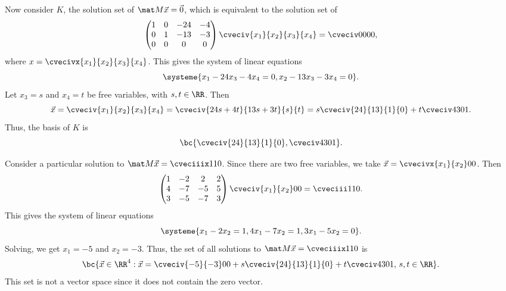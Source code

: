 \begin{solution}
\begin{ppart}
        Now consider $K$, the solution set of $\mat M \vec x = \vec 0$, which is equivalent to the solution set of \[\begin{pmatrix}1 & 0 & -24 & -4 \\ 0 & 1 & -13 & -3 \\ 0 & 0 & 0 & 0\end{pmatrix} \cveciv{x_1}{x_2}{x_3}{x_4} = \cveciv0000,\] where $x = \cvecivx{x_1}{x_2}{x_3}{x_4}$. This gives the system of linear equations \[\systeme{x_1 - 24 x_3 - 4 x_4 = 0, x_2 - 13 x_3 - 3x_4 = 0}.\] Let $x_3 = s$ and $x_4 = t$ be free variables, with $s, t \in \RR$. Then \[\vec x = \cveciv{x_1}{x_2}{x_3}{x_4} = \cveciv{24s + 4t}{13s + 3t}{s}{t} = s\cveciv{24}{13}{1}{0} + t\cveciv4301.\] Thus, the basis of $K$ is \[\bc{\cveciv{24}{13}{1}{0}, \cveciv4301}.\]
    \end{ppart}
    \begin{ppart}
        Consider a particular solution to $\mat M \vec x = \cveciiix110$. Since there are two free variables, we take $\vec x = \cvecivx{x_1}{x_2}00$. Then \[\begin{pmatrix}1 & -2 & 2 & 2 \\ 4 & -7 & -5 & 5 \\ 3 & -5 & -7 & 3\end{pmatrix}\cveciv{x_1}{x_2}00 = \cveciii110.\] This gives the system of linear equations \[\systeme{x_1 - 2x_2 = 1, 4x_1 - 7x_2 = 1, 3x_1 - 5x_2 = 0}.\] Solving, we get $x_1 = -5$ and $x_2 = -3$. Thus, the set of all solutions to $\mat M \vec x = \cveciiix110$ is \[\bc{\vec x \in \RR^4: \vec x = \cveciv{-5}{-3}00 + s\cveciv{24}{13}{1}{0} + t\cveciv4301, \, s, t \in \RR}.\] This set is not a vector space since it does not contain the zero vector.
    \end{ppart}
\end{solution}

